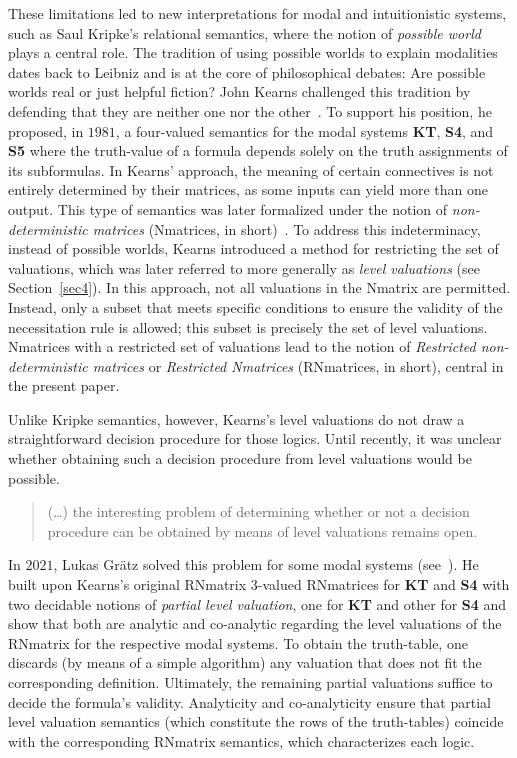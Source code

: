 \documentclass[12pt]{article}
\begin{document}
These limitations led to new interpretations for modal and intuitionistic systems, such as Saul Kripke's relational semantics, where the notion of \emph{possible world} plays a central role. The tradition of using possible worlds to explain modalities dates back to Leibniz and is at the core of philosophical debates: Are possible worlds real or just helpful fiction? John Kearns challenged this tradition by defending that they are neither one nor the other~\cite[p. 86]{kearns_modal_1981}. To support his position, he proposed, in $1981$, a four-valued semantics for the modal systems \textbf{KT}, \textbf{S4}, and \textbf{S5} where the truth-value of a formula depends solely on the truth assignments of its subformulas. In Kearns' approach, the meaning of certain connectives is not entirely determined by their matrices, as some inputs can yield more than one output. This type of semantics was later formalized under the notion of {\em non-deterministic matrices} (Nmatrices, in short)~\cite{avr:lev:01}. To address this indeterminacy, instead of possible worlds, Kearns introduced a method for restricting the set of valuations, which was later referred to more generally as {\em level valuations} (see Section~\ref{sec4}). In this approach, not all valuations in the Nmatrix are permitted. Instead, only a subset that meets specific conditions to ensure the validity of the necessitation rule is allowed; this subset is precisely the set of level valuations. Nmatrices with a restricted set of valuations lead to the notion of {\em Restricted non-deterministic matrices} or  {\em Restricted Nmatrices} (RNmatrices, in short), central in the present paper.

Unlike Kripke semantics, however, Kearns's level valuations do not draw a straightforward decision procedure for those logics. Until recently, it was unclear whether obtaining such a decision procedure from level valuations would be possible. 

\begin{quote}
(\ldots) the interesting problem of determining whether or not a decision procedure can be obtained by means of level valuations remains open.~\cite{coniglio_errata_2016}
\end{quote}

In $2021$, Lukas Gr\"atz solved this problem for some modal systems (see~\cite{gratz_truth_2022}). He built upon Kearns's original RNmatrix $3$-valued RNmatrices for \textbf{KT} and \textbf{S4} with two decidable notions of \emph{partial level valuation}, one for \textbf{KT} and other for \textbf{S4} and show that both are analytic and co-analytic regarding the level valuations of the RNmatrix for the respective modal systems. To obtain the truth-table, one discards (by means of  a simple algorithm) any valuation that does not fit the corresponding definition. Ultimately, the remaining partial valuations suffice to decide the formula's validity. Analyticity and co-analyticity ensure that partial level valuation semantics (which constitute the rows of the truth-tables) coincide with the corresponding RNmatrix semantics, which characterizes each logic.
\end{document}

